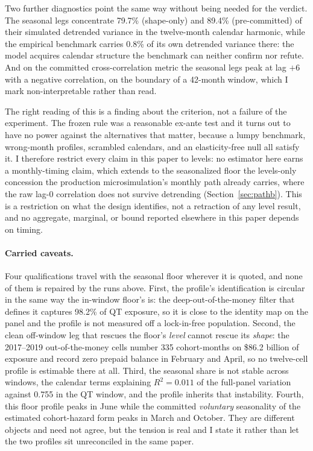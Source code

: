 \documentclass[12pt]{article}
\begin{document}
Two further diagnostics point the same way without being needed for the verdict. The seasonal legs concentrate 79.7\% (shape-only) and 89.4\% (pre-committed) of their simulated detrended variance in the twelve-month calendar harmonic, while the empirical benchmark carries 0.8\% of its own detrended variance there: the model acquires calendar structure the benchmark can neither confirm nor refute. And on the committed cross-correlation metric the seasonal legs peak at lag $+6$ with a negative correlation, on the boundary of a 42-month window, which I mark non-interpretable rather than read.

The right reading of this is a finding about the criterion, not a failure of the experiment. The frozen rule was a reasonable ex-ante test and it turns out to have no power against the alternatives that matter, because a lumpy benchmark, wrong-month profiles, scrambled calendars, and an elasticity-free null all satisfy it. I therefore restrict every claim in this paper to levels: no estimator here earns a monthly-timing claim, which extends to the seasonalized floor the levels-only concession the production microsimulation's monthly path already carries, where the raw lag-0 correlation does not survive detrending (Section~\ref{sec:pathb}). This is a restriction on what the design identifies, not a retraction of any level result, and no aggregate, marginal, or bound reported elsewhere in this paper depends on timing.

\paragraph{Carried caveats.} Four qualifications travel with the seasonal floor wherever it is quoted, and none of them is repaired by the runs above. First, the profile's identification is circular in the same way the in-window floor's is: the deep-out-of-the-money filter that defines it captures 98.2\% of QT exposure, so it is close to the identity map on the panel and the profile is not measured off a lock-in-free population. Second, the clean off-window leg that rescues the floor's \emph{level} cannot rescue its \emph{shape}: the 2017--2019 out-of-the-money cells number 335 cohort-months on \$86.2 billion of exposure and record zero prepaid balance in February and April, so no twelve-cell profile is estimable there at all. Third, the seasonal share is not stable across windows, the calendar terms explaining $R^2 = 0.011$ of the full-panel variation against 0.755 in the QT window, and the profile inherits that instability. Fourth, this floor profile peaks in June while the committed \emph{voluntary} seasonality of the estimated cohort-hazard form peaks in March and October. They are different objects and need not agree, but the tension is real and I state it rather than let the two profiles sit unreconciled in the same paper.
\end{document}
